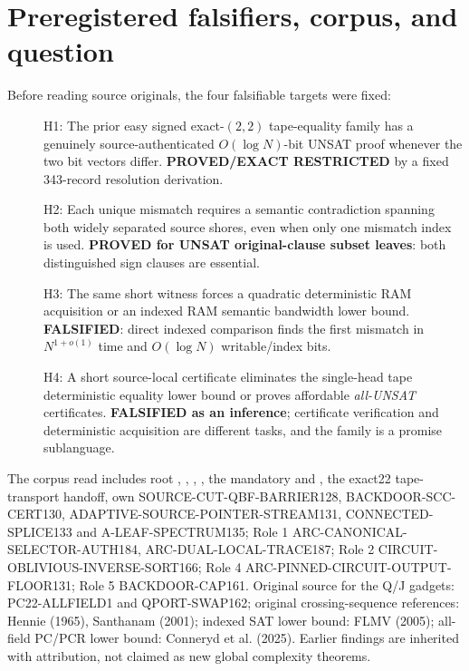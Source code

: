 \documentclass[11pt]{article}
\begin{document}
\section{Preregistered falsifiers, corpus, and question}
Before reading source originals, the four falsifiable targets were fixed:
\begin{description}
\item[] H1: The prior easy signed exact-$(2,2)$ tape-equality family has a genuinely source-authenticated $O(\log N)$-bit UNSAT proof whenever the two bit vectors differ. \textbf{PROVED/EXACT RESTRICTED} by a fixed 343-record resolution derivation.
\item[] H2: Each unique mismatch requires a semantic contradiction spanning both widely separated source shores, even when only one mismatch index is used. \textbf{PROVED for UNSAT original-clause subset leaves}: both distinguished sign clauses are essential.
\item[] H3: The same short witness forces a quadratic deterministic RAM acquisition or an indexed RAM semantic bandwidth lower bound. \textbf{FALSIFIED}: direct indexed comparison finds the first mismatch in $N^{1+o(1)}$ time and $O(\log N)$ writable/index bits.
\item[] H4: A short source-local certificate eliminates the single-head tape deterministic equality lower bound or proves affordable \emph{all-UNSAT} certificates. \textbf{FALSIFIED as an inference}; certificate verification and deterministic acquisition are different tasks, and the family is a promise sublanguage.
\end{description}
The corpus read includes root , , , , the mandatory  and , the exact22 tape-transport handoff, own SOURCE-CUT-QBF-BARRIER128, BACKDOOR-SCC-CERT130, ADAPTIVE-SOURCE-POINTER-STREAM131, CONNECTED-SPLICE133 and A-LEAF-SPECTRUM135; Role 1 ARC-CANONICAL-SELECTOR-AUTH184, ARC-DUAL-LOCAL-TRACE187; Role 2 CIRCUIT-OBLIVIOUS-INVERSE-SORT166; Role 4 ARC-PINNED-CIRCUIT-OUTPUT-FLOOR131; Role 5 BACKDOOR-CAP161. Original source for the Q/J gadgets: PC22-ALLFIELD1 and QPORT-SWAP162; original crossing-sequence references: Hennie (1965), Santhanam (2001); indexed SAT lower bound: FLMV (2005); all-field PC/PCR lower bound: Conneryd et al. (2025). Earlier findings are inherited with attribution, not claimed as new global complexity theorems.
\end{document}
